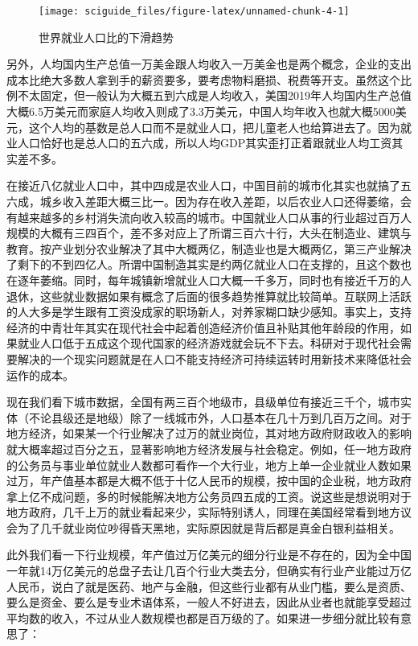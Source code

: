 \documentclass[]{tufte-book}
\begin{document}
\begin{figure}
\texttt{[image: sciguide\_files/figure-latex/unnamed-chunk-4-1]} \caption[世界就业人口比的下滑趋势]{世界就业人口比的下滑趋势}\label{fig:unnamed-chunk-4}
\end{figure}

另外，人均国内生产总值一万美金跟人均收入一万美金也是两个概念，企业的支出成本比绝大多数人拿到手的薪资要多，要考虑物料磨损、税费等开支。虽然这个比例不太固定，但一般认为大概五到六成是人均收入，美国2019年人均国内生产总值大概6.5万美元而家庭人均收入则成了3.3万美元，中国人均年收入也就大概5000美元，这个人均的基数是总人口而不是就业人口，把儿童老人也给算进去了。因为就业人口恰好也是总人口的五六成，所以人均GDP其实歪打正着跟就业人均工资其实差不多。

在接近八亿就业人口中，其中四成是农业人口，中国目前的城市化其实也就搞了五六成，城乡收入差距大概三比一。因为存在收入差距，以后农业人口还得萎缩，会有越来越多的乡村消失流向收入较高的城市。中国就业人口从事的行业超过百万人规模的大概有三四百个，差不多对应上了所谓三百六十行，大头在制造业、建筑与教育。按产业划分农业解决了其中大概两亿，制造业也是大概两亿，第三产业解决了剩下的不到四亿人。所谓中国制造其实是约两亿就业人口在支撑的，且这个数也在逐年萎缩。同时，每年城镇新增就业人口大概一千多万，同时也有接近千万的人退休，这些就业数据如果有概念了后面的很多趋势推算就比较简单。互联网上活跃的人大多是学生跟有工资没成家的职场新人，对养家糊口缺少感知。事实上，支持经济的中青壮年其实在现代社会中起着创造经济价值且补贴其他年龄段的作用，如果就业人口低于五成这个现代国家的经济游戏就会玩不下去。科研对于现代社会需要解决的一个现实问题就是在人口不能支持经济可持续运转时用新技术来降低社会运作的成本。

现在我们看下城市数据，全国有两三百个地级市，县级单位有接近三千个，城市实体（不论县级还是地级）除了一线城市外，人口基本在几十万到几百万之间。对于地方经济，如果某一个行业解决了过万的就业岗位，其对地方政府财政收入的影响就大概率超过百分之五，显著影响地方经济发展与社会稳定。例如，任一地方政府的公务员与事业单位就业人数都可看作一个大行业，地方上单一企业就业人数如果过万，年产值基本都是大概不低于十亿人民币的规模，按中国的企业税，地方政府拿上亿不成问题，多的时候能解决地方公务员四五成的工资。说这些是想说明对于地方政府，几千上万的就业看起来少，实际特别诱人，同理在美国经常看到地方议会为了几千就业岗位吵得昏天黑地，实际原因就是背后都是真金白银利益相关。

此外我们看一下行业规模，年产值过万亿美元的细分行业是不存在的，因为全中国一年就14万亿美元的总盘子去让几百个行业大类去分，但确实有行业产业能过万亿人民币，说白了就是医药、地产与金融，但这些行业都有从业门槛，要么是资质、要么是资金、要么是专业术语体系，一般人不好进去，因此从业者也就能享受超过平均数的收入，不过从业人数规模也都是百万级的了。如果进一步细分就比较有意思了：
\end{document}
